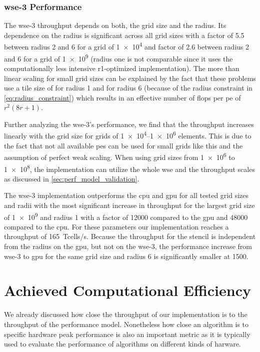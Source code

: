 \subsubsection{\ac{wse}-3 Performance}
The \ac{wse}-3 throughput depends on both, the grid size and the radius. Its dependence on the radius is significant across all grid sizes with a factor of \num{5.5} between radius \num{2} and \num{6} for a grid of \num{1e4} and factor of \num{2.6} between radius \num{2} and \num{6} for a grid of \num{1e9} (radius one is not comparable since it uses the computationally less intensive r1-optimized implementation).
The more than linear scaling for small grid sizes can be explained by the fact that these problems use a tile size of  for radius \num{1} and  for radius \num{6} (because of the radius constraint in \autoref{eq:radius_constraint}) which results in an effective number of \acp{flop} per \ac{pe} of $r^2(8r+1)$.

Further analyzing the \ac{wse}-3's performance, we find that the throughput increases linearly with the grid size for grids of \numrange{1e4}{1e6} elements. This is due to the fact that not all available \acp{pe} can be used for small grids like this and the assumption of perfect weak scaling. When using grid sizes from \num{1e6} to \num{1e8}, the implementation can utilize the whole \ac{wse} and the throughput scales as discussed in \autoref{sec:perf_model_validation}.

The \ac{wse}-3 implementation outperforms the \ac{cpu} and \ac{gpu} for all tested grid sizes and radii with the most significant increase in throughput for the largest grid size of \num{1e9} and radius \num{1} with a factor of \num{12000} compared to the \ac{gpu} and \num{48000} compared to the \ac{cpu}. For these parameters our implementation reaches a throughput of \qty{165}{\tera cells/s}. Because the throughput for the stencil is independent from the radius on the \ac{gpu}, but not on the \ac{wse}-3, the performance increase from \ac{wse}-3 to \ac{gpu} for the same grid size and radius \num{6} is significantly smaller at \num{1500}.

\section{Achieved Computational Efficiency}
We already discussed how close the throughput of our implementation is to the throughput of the performance model.
Nonetheless how close an algorithm is to specific hardware peak performance is also an important metric as it is typically used to evaluate the performance of algorithms on different kinds of harware.

